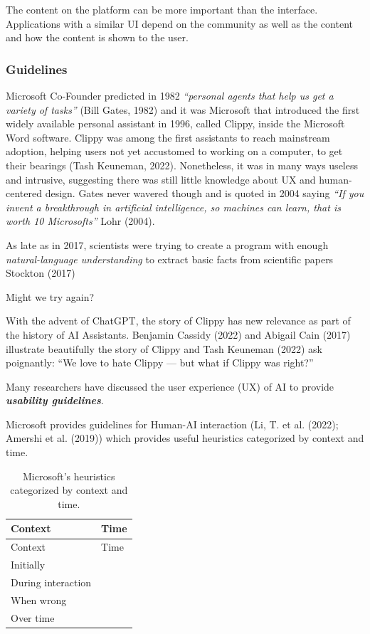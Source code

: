 \documentclass[
  letterpaper,
  DIV=11,
  numbers=noendperiod]{scrartcl}
\begin{document}
The content on the platform can be more important than the interface.
Applications with a similar UI depend on the community as well as the
content and how the content is shown to the user.

\subsubsection{Guidelines}\label{guidelines}

Microsoft Co-Founder predicted in 1982 \emph{``personal agents that help
us get a variety of tasks''} (Bill Gates, 1982) and it was Microsoft
that introduced the first widely available personal assistant in 1996,
called Clippy, inside the Microsoft Word software. Clippy was among the
first assistants to reach mainstream adoption, helping users not yet
accustomed to working on a computer, to get their bearings (Tash
Keuneman, 2022). Nonetheless, it was in many ways useless and intrusive,
suggesting there was still little knowledge about UX and human-centered
design. Gates never wavered though and is quoted in 2004 saying
\emph{``If you invent a breakthrough in artificial intelligence, so
machines can learn, that is worth 10 Microsofts''} Lohr (2004).

As late as in 2017, scientists were trying to create a program with
enough \emph{natural-language understanding} to extract basic facts from
scientific papers Stockton (2017)

Might we try again?

With the advent of ChatGPT, the story of Clippy has new relevance as
part of the history of AI Assistants. Benjamin Cassidy (2022) and
Abigail Cain (2017) illustrate beautifully the story of Clippy and Tash
Keuneman (2022) ask poignantly: ``We love to hate Clippy --- but what if
Clippy was right?''

Many researchers have discussed the user experience (UX) of AI to
provide \textbf{\emph{usability guidelines}}.

Microsoft provides guidelines for Human-AI interaction (Li, T. et al.
(2022); Amershi et al. (2019)) which provides useful heuristics
categorized by context and time.

\begin{longtable}[]{@{}ll@{}}
\caption{Microsoft's heuristics categorized by context and
time.}\tabularnewline
\toprule\noalign{}
Context & Time \\
\midrule\noalign{}
\endfirsthead
\toprule\noalign{}
Context & Time \\
\midrule\noalign{}
\endhead
\bottomrule\noalign{}
\endlastfoot
Initially & \\
During interaction & \\
When wrong & \\
Over time & \\
\end{longtable}
\end{document}
